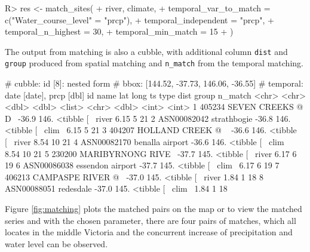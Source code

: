 \documentclass[
]{jss}
\begin{document}
\begin{CodeChunk}
\begin{CodeInput}
R> res <- match_sites(
+   river, climate,
+   temporal_var_to_match = c("Water_course_level" = "prcp"),
+   temporal_independent = "prcp",  
+   temporal_n_highest = 30,
+   temporal_min_match = 15
+ )
\end{CodeInput}
\end{CodeChunk}

The output from matching is also a cubble, with additional column
\texttt{dist} and \texttt{group} produced from spatial matching and
\texttt{n\_match} from the temporal matching.

\begin{CodeChunk}
\begin{CodeOutput}
# cubble:   id [8]: nested form
# bbox:     [144.52, -37.73, 146.06, -36.55]
# temporal: date [date], prcp [dbl]
  id          name                lat  long ts         type   dist group n_match
  <chr>       <chr>             <dbl> <dbl> <list>     <chr> <dbl> <int>   <int>
1 405234      SEVEN CREEKS @ D~ -36.9  146. <tibble [~ river  6.15     5      21
2 ASN00082042 strathbogie       -36.8  146. <tibble [~ clim~  6.15     5      21
3 404207      HOLLAND CREEK @ ~ -36.6  146. <tibble [~ river  8.54    10      21
4 ASN00082170 benalla airport   -36.6  146. <tibble [~ clim~  8.54    10      21
5 230200      MARIBYRNONG RIVE~ -37.7  145. <tibble [~ river  6.17     6      19
6 ASN00086038 essendon airport  -37.7  145. <tibble [~ clim~  6.17     6      19
7 406213      CAMPASPE RIVER @~ -37.0  145. <tibble [~ river  1.84     1      18
8 ASN00088051 redesdale         -37.0  145. <tibble [~ clim~  1.84     1      18
\end{CodeOutput}
\end{CodeChunk}

Figure \ref{fig:matching} plots the matched pairs on the map or to view
the matched series and with the chosen parameter, there are four pairs
of matches, which all locates in the middle Victoria and the concurrent
increase of precipitation and water level can be observed.
\end{document}

